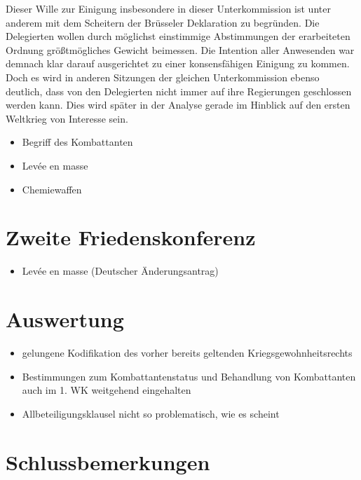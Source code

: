 \documentclass[12pt]{scrartcl}
\begin{document}
Dieser Wille zur Einigung insbesondere in dieser Unterkommission ist unter anderem mit dem Scheitern der Brüsseler Deklaration zu begründen. Die Delegierten wollen durch möglichst einstimmige Abstimmungen der erarbeiteten Ordnung größtmögliches Gewicht beimessen. Die Intention aller Anwesenden war demnach klar darauf ausgerichtet zu einer konsensfähigen Einigung zu kommen. Doch es wird in anderen Sitzungen der gleichen Unterkommission ebenso deutlich, dass von den Delegierten nicht immer auf ihre Regierungen geschlossen werden kann. Dies wird später in der Analyse gerade im Hinblick auf den ersten Weltkrieg von Interesse sein.

\begin{itemize}
	\item Begriff des Kombattanten\cite{Buss1992}
	\item Levée en masse\cite{Scott1920}
	\item Chemiewaffen\cite{Scott1920}
\end{itemize}
\section{Zweite Friedenskonferenz}
\begin{itemize}
	\item Levée en masse (Deutscher Änderungsantrag)
\end{itemize}
\section{Auswertung}
\begin{itemize}
	\item gelungene Kodifikation des vorher bereits geltenden Kriegsgewohnheitsrechts
	\item Bestimmungen zum Kombattantenstatus und Behandlung von Kombattanten auch im 1. WK weitgehend eingehalten
	\item Allbeteiligungsklausel nicht so problematisch, wie es scheint
\end{itemize}
\cite{Gasser1991}
\cite{Lingen2014}
\cite{Fraenkel1968}
\cite{Heffter1951}
\cite{DeutschesReich2010}
\cite{Scott1921}



\section{Schlussbemerkungen}


\newpage

\printbibliography
{}


\newpage
{}
\end{document}
